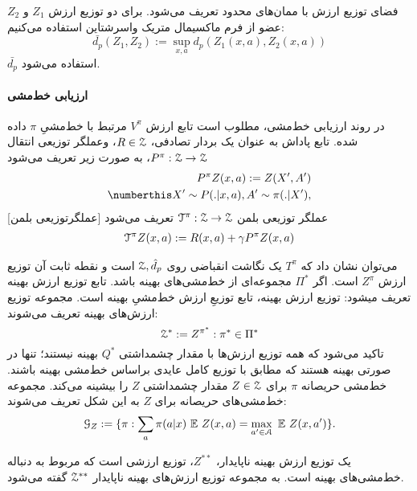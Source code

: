 فضای توزیع ارزش با ممان‌های
 محدود تعریف می‌شود.
برای دو توزیع ارزش 
$Z_1$
و
$Z_2$
عضو 
از فرم ماکسیمال متریک واسرشتاین
استفاده می‌کنیم:
$$\bar{d_p}(Z_1,Z_2) := \sup_{x,a} d_p(Z_1(x,a),Z_2(x,a))$$
$\bar{d_p}$
 استفاده می‌شود.
\paragraph{ارزیابی خط‌مشی}
در روند ارزیابی خط‌مشی، مطلوب است تابع ارزش
$V^\pi$
مرتبط با خط‌مشیِ $\pi$ داده شده. 
تابع پاداش به عنوان یک بردار تصادفی، 
$R \in \EuScript{Z}$،
وعملگر توزیعی انتقال 
$P^\pi : \EuScript{Z} \rightarrow \EuScript{Z}$،
به صورت زیر تعریف می‌شود
\begin{align}
P^{\pi} Z(x,a) := Z(X',A') \\ \numberthis
X' \sim P(.|x,a), A'\sim \pi (.|X'), \nonumber
\end{align}
[عملگرتوزیعی بلمن]
 عملگر توزیعی بلمن $\EuScript{T}^\pi : \EuScript{Z} \rightarrow \EuScript{Z}$ تعریف می‌شود
\begin{align}
	\EuScript{T}^\pi Z(x,a) := R(x,a)+ \gamma P^\pi Z(x,a)
\end{align}  



می‌توان نشان داد که $T^\pi$ یک نگاشت انقباضی 
روی
 $\EuScript{Z},\hat{d}_p$
  است و نقطه ثابت آن توزیع ارزش 
$Z^\pi$
    است.
اگر 
$\Pi^*$
مجموعه‌ای از خط‌مشی‌های بهینه باشد. 
تابع توزیع ارزش بهینه تعریف میشود:
توزیع ارزش بهینه، تابع توزیعِ ارزش خط‌مشیِ بهینه است. مجموعه توزیع ارزش‌های بهینه تعریف می‌شوند:
$$\EuScript{Z}^* := {Z^{\pi^{*}} : \pi^* \in \Pi^* }$$
تاکید می‌شود که همه توزیع ارزش‌ها با مقدار چشمداشتی $Q^*$ 
بهینه نیستند؛ تنها در صورتی بهینه هستند که مطابق با توزیع کامل عایدی بر‌اساس خط‌مشی بهینه باشند.
خط‌مشی حریصانه
$\pi$
برای
$Z \in \EuScript{Z}$
مقدار چشمداشتی
$Z$
 را بیشینه می‌کند.
 مجموعه خط‌مشی‌های حریصانه برای 
 $Z$
 به این شکل تعریف می‌شوند:
 $$\EuScript{G}_Z := \lbrace \pi : \sum_{a} \pi (a|x) \ \mathbb{E} \ Z(x,a) = \max_{a' \in \EuScript{A}} \ \mathbb{E} \ Z(x,a') \rbrace.$$

یک توزیع ارزش بهینه ناپایدار،
$Z^{**}$،
توزیع ارزشی‌ است که مربوط به دنباله خط‌مشی‌های بهینه است. به مجموعه‌ توزیع ارزش‌های بهینه ناپایدار 
 $\EuScript{Z}^{**}$
 گفته می‌شود.

